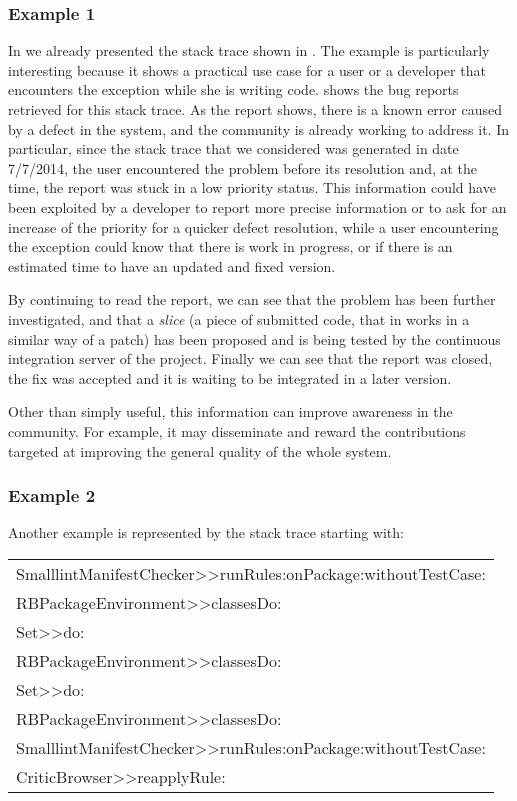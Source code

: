 \subsubsection{Example 1}

In  we already presented the stack trace shown in .
The example is particularly interesting because it shows a practical use case for a user or a developer that encounters the exception while she is writing code.
 shows the bug reports retrieved for this stack trace.
As the report shows, there is a known error caused by a defect in the system, and the community is already working to address it.
In particular, since the stack trace that we considered was generated in date 7/7/2014, the user encountered the problem before its resolution and, at the time, the report was stuck in a low priority status.
This information could have been exploited by a developer to report more precise information or to ask for an increase of the priority for a quicker defect resolution, while a user encountering the exception could know that there is work in progress, or if there is an estimated time to have an updated and fixed version.

By continuing to read the report, we can see that the problem has been further investigated, and that a \emph{slice} (a piece of submitted code, that in \pha works in a similar way of a patch) has been proposed and is being tested by the continuous integration server of the project.
Finally we can see that the report was closed, the fix was accepted and it is waiting to be integrated in a later version.

Other than simply useful, this information can improve awareness in the community.
For example, it may disseminate and reward the contributions targeted at improving the general quality of the whole system.


\subsubsection{Example 2} Another example is represented by the stack trace starting with:

{\footnotesize
\begin{center}
\begin{tabular}{l}
SmalllintManifestChecker{>}{>}runRules:onPackage:withoutTestCase: \\
RBPackageEnvironment{>}{>}classesDo: \\
Set{>}{>}do: \\
RBPackageEnvironment{>}{>}classesDo: \\
Set{>}{>}do: \\
RBPackageEnvironment{>}{>}classesDo: \\
SmalllintManifestChecker{>}{>}runRules:onPackage:withoutTestCase: \\
CriticBrowser{>}{>}reapplyRule:
\end{tabular}
\end{center}}


